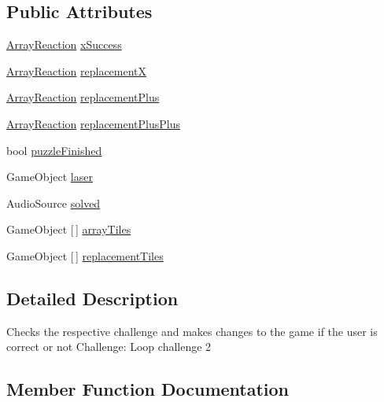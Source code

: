 \subsection*{Public Attributes}
\begin{DoxyCompactItemize}
\item 
\hyperlink{class_array_reaction}{Array\+Reaction} \hyperlink{class_completion_script_four_a747aafbf72eb507c388cb72ad6911b13}{x\+Success}
\item 
\hyperlink{class_array_reaction}{Array\+Reaction} \hyperlink{class_completion_script_four_a0ca2da180578a27db3671b64e3c83aa7}{replacementX}
\item 
\hyperlink{class_array_reaction}{Array\+Reaction} \hyperlink{class_completion_script_four_a7e5f7bcf0c065ea353de75d5d1691ec5}{replacement\+Plus}
\item 
\hyperlink{class_array_reaction}{Array\+Reaction} \hyperlink{class_completion_script_four_ad490db1318afdbb5065effc988b97652}{replacement\+Plus\+Plus}
\item 
bool \hyperlink{class_completion_script_four_a68c845d369b9cbc78be0596acf49040a}{puzzle\+Finished}
\item 
Game\+Object \hyperlink{class_completion_script_four_ac3a10e751902cbc84d5ca93bc321509a}{laser}
\item 
Audio\+Source \hyperlink{class_completion_script_four_ac78527b696de4ff5992bec7fef332014}{solved}
\item 
Game\+Object \mbox{[}$\,$\mbox{]} \hyperlink{class_completion_script_four_afb5331e25190b2ccd25dda02ebc6f2fa}{array\+Tiles}
\item 
Game\+Object \mbox{[}$\,$\mbox{]} \hyperlink{class_completion_script_four_a5f540699a916116acc868e46b2445352}{replacement\+Tiles}
\end{DoxyCompactItemize}


\subsection{Detailed Description}
Checks the respective challenge and makes changes to the game if the user is correct or not Challenge\+: Loop challenge 2 

\subsection{Member Function Documentation}
\mbox{\label{class_completion_script_four_a49300ed9b78d89b8f68cdf6391925498}} 
